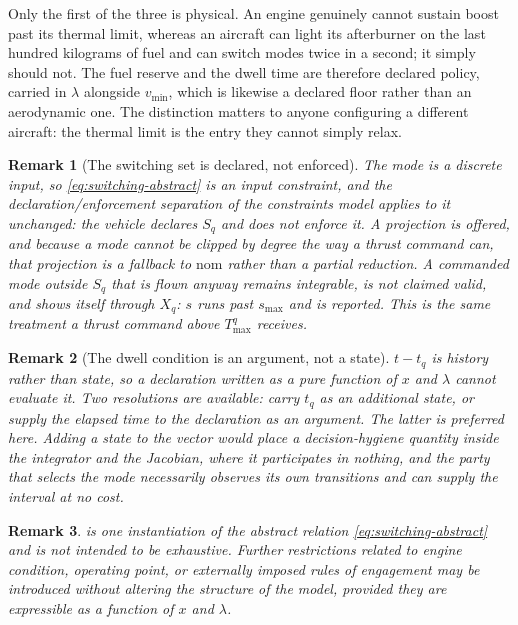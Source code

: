 \documentclass[11pt,a4paper]{article}
\newtheorem{remark}{Remark}
\newcommand{\Xset}{X}
\newcommand{\Sset}{S}
\newcommand{\vecx}{x}
\newcommand{\veclambda}{\lambda}
\begin{document}
Only the first of the three is physical. An engine genuinely cannot sustain
boost past its thermal limit, whereas an aircraft can light its afterburner on
the last hundred kilograms of fuel and can switch modes twice in a second; it
simply should not. The fuel reserve and the dwell time are therefore declared
policy, carried in $\veclambda$ alongside $v_{\min}$, which is likewise a
declared floor rather than an aerodynamic one. The distinction matters to
anyone configuring a different aircraft: the thermal limit is the entry they
cannot simply relax.

\begin{remark}[The switching set is declared, not enforced]
The mode is a discrete input, so \cref{eq:switching-abstract} is an input
constraint, and the declaration/enforcement separation of the constraints model
applies to it unchanged: the vehicle \emph{declares} $\Sset_q$ and does not
enforce it. A
projection is offered, and because a mode cannot be clipped by degree the way a
thrust command can, that projection is a fallback to $\mathrm{nom}$ rather than
a partial reduction. A commanded mode outside $\Sset_q$ that is flown anyway
remains integrable, is not claimed valid, and shows itself through
$\Xset_q$: $s$ runs past $s_{\max}$ and is reported. This is the same treatment
a thrust command above $T^{q}_{\max}$ receives.
\end{remark}

\begin{remark}[The dwell condition is an argument, not a state]
$t - t_{q}$ is history rather than state, so a declaration written as a pure
function of $\vecx$ and $\veclambda$ cannot evaluate it. Two resolutions are
available: carry $t_{q}$ as an additional state, or supply the elapsed time to
the declaration as an argument. The latter is preferred here. Adding a state to
the vector would place a decision-hygiene quantity inside the integrator and
the Jacobian, where it participates in nothing, and the party that selects the
mode necessarily observes its own transitions and can supply the interval at no
cost.
\end{remark}

\begin{remark}
 is one instantiation of the abstract relation
\cref{eq:switching-abstract} and is not intended to be exhaustive. Further
restrictions related to engine condition, operating point, or externally imposed
rules of engagement may be introduced without altering the structure of the
model, provided they are expressible as a function of $\vecx$ and $\veclambda$.
\end{remark}
\end{document}
